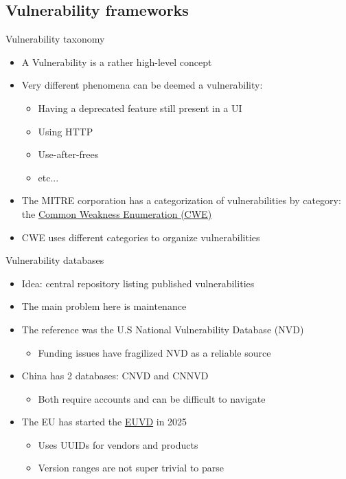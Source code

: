 \subsection{Vulnerability frameworks}

\begin{frame}{Vulnerability taxonomy}
  \begin{itemize}
    \item A Vulnerability is a rather high-level concept
    \item Very different phenomena can be deemed a vulnerability:
    \begin{itemize}
      \item Having a deprecated feature still present in a UI
      \item Using HTTP
      \item Use-after-frees
      \item etc...
    \end{itemize}
    \item The MITRE corporation has a categorization of vulnerabilities by category:
          the \href{https://cwe.mitre.org/}{Common Weakness Enumeration (CWE)}
    \item CWE uses different categories to organize vulnerabilities
  \end{itemize}
\end{frame}

\begin{frame}{Vulnerability databases}
  \begin{itemize}
    \item Idea: central repository listing published vulnerabilities
    \item The main problem here is maintenance
    \item The reference was the U.S National Vulnerability Database (NVD)
    \begin{itemize}
      \item Funding issues have fragilized NVD as a reliable source
    \end{itemize}
    \item China has 2 databases: CNVD and CNNVD
    \begin{itemize}
      \item Both require accounts and can be difficult to navigate 
    \end{itemize}
    \item The EU has started the \href{https://euvd.enisa.europa.eu/search}{EUVD} in 2025
    \begin{itemize}
      \item Uses UUIDs for vendors and products
      \item Version ranges are not super trivial to parse
    \end{itemize}
  \end{itemize}
\end{frame}

